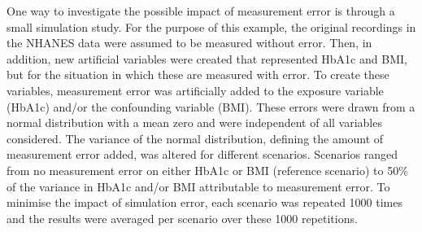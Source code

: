 \documentclass[
  letterpaper,
  DIV=11,
  numbers=noendperiod]{scrartcl}
\begin{document}
One way to investigate the possible impact of measurement error is
through a small simulation study. For the purpose of this example, the
original recordings in the NHANES data were assumed to be measured
without error. Then, in addition, new artificial variables were created
that represented HbA1c and BMI, but for the situation in which these are
measured with error. To create these variables, measurement error was
artificially added to the exposure variable (HbA1c) and/or the
confounding variable (BMI). These errors were drawn from a normal
distribution with a mean zero and were independent of all variables
considered. The variance of the normal distribution, defining the amount
of measurement error added, was altered for different scenarios.
Scenarios ranged from no measurement error on either HbA1c or BMI
(reference scenario) to 50\% of the variance in HbA1c and/or BMI
attributable to measurement error. To minimise the impact of simulation
error, each scenario was repeated 1000 times and the results were
averaged per scenario over these 1000 repetitions.
\end{document}
